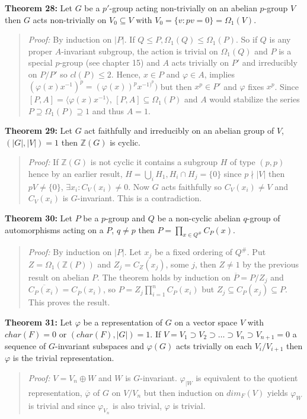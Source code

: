 {\bf Theorem 28:}
Let $G$ be a $p'$-group acting non-trivially on an abelian $p$-group $V$ then $G$ acts
non-trivially on $V_0 \subseteq V$ with $V_0 = \{ v: pv= 0 \} = \Omega_1(V)$.
\begin{quote}
\emph{Proof:}  By induction on $|P|$.  If $Q \le P, \Omega_1(Q) \le \Omega_1(P)$.  So if
$Q$ is any proper $A$-invariant subgroup, the action is trivial on $\Omega_1(Q)$
and $P$ is a special $p$-group (see chapter 15) and $A$ acts trivially on $P'$ and
irreducibly on $P/P'$ so $cl(P) \le 2$.  Hence,
$x \in P$ and $\varphi \in  A$, implies $ (\varphi(x)x^{-1})^p = (\varphi(x))^px^{-1)^p}) $
but then $x^p \in P'$ and $\varphi$ fixes $x^p$.  Since $[P,A] = \langle \varphi(x) x^{-1} \rangle$,
$[P, A] \subseteq \Omega_1(P)$ and $A$ would stabilize the series
$P \supseteq \Omega_1(P) \supseteq 1$ and thus $A=1$.
\end{quote}
{\bf Theorem 29:}
Let $G$ act faithfully and irreducibly on an abelian group of $V$, $(|G|, |V|)= 1$ then
${\mathbb Z}(G)$ is cyclic.
\begin{quote}
\emph{Proof:}  If ${\mathbb Z}(G)$ is not cyclic it contains a subgroup $H$ of type $(p, p)$ hence
by an earlier result, $H= \bigcup_{i} H_1, H_i \cap H_j = \{ 0 \}$ since $p \nmid |V|$ then $pV \ne \{ 0 \}$, $\exists x_i: C_V(x_i ) \ne 0$.  Now $G$
acts faithfully so $C_V(x_i) \ne V$ and $C_V(x_i)$ is $G$-invariant.  This is a contradiction.
\end{quote}
{\bf Theorem 30:}
Let $P$ be a $p$-group and $Q$ be a non-cyclic abelian $q$-group of automorphisms acting on a $P$,
$q \ne p$
then $P= \prod_{x \in Q^{\#}} C_P(x)$.
\begin{quote}
\emph{Proof:}  By induction on $|P|$.
Let $x_j$ be a fixed ordering of $Q^{\#}$.
Put $Z= \Omega_1({\mathbb Z}(P))$ and $Z_j= C_Z(x_j)$, some $j$,
then $Z \ne 1$ by the previous result on abelian $P$.
The theorem holds by induction on ${\overline P}= P/Z_j$ and
${\overline {C_P(x_i)}}= C_{\overline P}(x_i)$, so $P= Z_j \prod_{i=1}^n C_P(x_i)$ but
$Z_j \subseteq C_P(x_j) \subseteq P$.  This proves the result.
\end{quote}
{\bf Theorem 31:}
Let $\varphi$ be a representation of $G$ on a vector space $V$ with $char(F)=0$ or
$(char(F), |G|) = 1$. If $ V= V_1 \supset V_2 \supset \ldots \supset V_n \supset V_{n+1}= 0$ a sequence of $G$-invariant
subspaces and $\varphi(G)$ acts trivially on each $V_i/V_{i+1}$ then $\varphi$ is the trivial
representation.
\begin{quote}
\emph{Proof:}  $V= V_n \oplus W$ and $W$ is $G$-invariant.  $\varphi_{|W}$ is equivalent to the
quotient representation, ${\overline {\varphi}}$ of $G$ on $V/V_n$ but then
induction on $dim_F(V)$ yields $\varphi_{W}$ is trivial and since $\varphi_{V_n}$ is also
trivial, $\varphi$ is trivial.
\end{quote}
